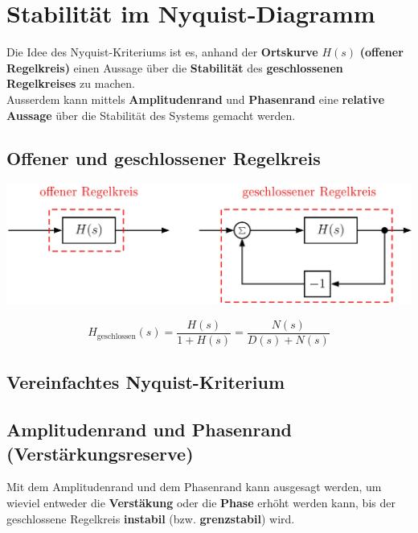 \section{Stabilität im Nyquist-Diagramm}

Die Idee des Nyquist-Kriteriums ist es, anhand der \textbf{Ortskurve} $H(s)$ \textbf{(offener Regelkreis)} einen Aussage über die
\textbf{Stabilität} des \textbf{geschlossenen Regelkreises} zu machen. \\
Ausserdem kann mittels \textbf{Amplitudenrand} und \textbf{Phasenrand} eine \textbf{relative Aussage} über die Stabilität
des Systems gemacht werden.


\subsection{Offener und geschlossener Regelkreis}

\includegraphics[width=0.75\columnwidth]{images/offener_geschlossener_regelkreis.png}

$$ H_{\text{geschlossen}}(s) = \frac{H(s)}{1 + H(s)} = \frac{N(s)}{D(s) + N(s)} $$


\subsection{Vereinfachtes Nyquist-Kriterium}



\subsection{Amplitudenrand und Phasenrand (Verstärkungsreserve)}

Mit dem Amplitudenrand und dem Phasenrand kann ausgesagt werden, um wieviel entweder die \textbf{Verstäkung} oder die \textbf{Phase}
erhöht werden kann, bis der geschlossene Regelkreis \textbf{instabil} (bzw. \textbf{grenzstabil}) wird.

